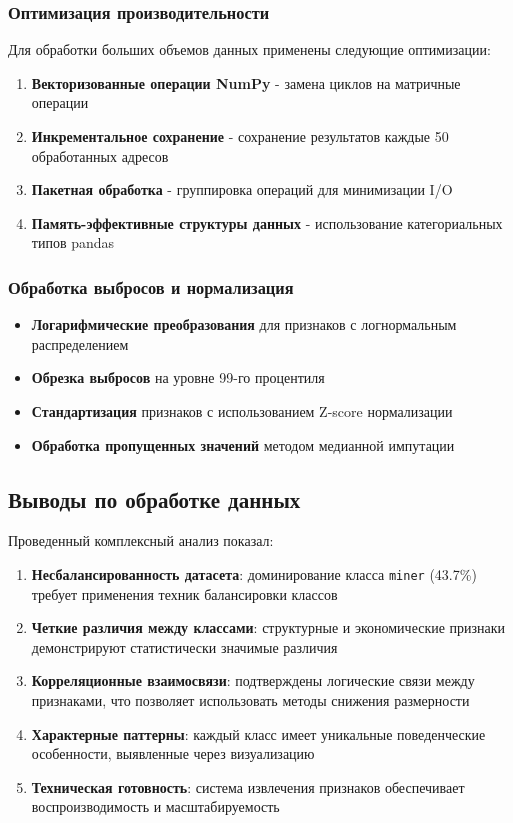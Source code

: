 \subsubsection{Оптимизация производительности}

Для обработки больших объемов данных применены следующие оптимизации:

\begin{enumerate}
    \item \textbf{Векторизованные операции NumPy} - замена циклов на матричные операции
    \item \textbf{Инкрементальное сохранение} - сохранение результатов каждые 50 обработанных адресов
    \item \textbf{Пакетная обработка} - группировка операций для минимизации I/O
    \item \textbf{Память-эффективные структуры данных} - использование категориальных типов pandas
\end{enumerate}

\subsubsection{Обработка выбросов и нормализация}

\begin{itemize}
    \item \textbf{Логарифмические преобразования} для признаков с логнормальным распределением
    \item \textbf{Обрезка выбросов} на уровне 99-го процентиля
    \item \textbf{Стандартизация} признаков с использованием Z-score нормализации
    \item \textbf{Обработка пропущенных значений} методом медианной импутации
\end{itemize}

\subsection{Выводы по обработке данных}

Проведенный комплексный анализ показал:

\begin{enumerate}
    \item \textbf{Несбалансированность датасета}: доминирование класса \texttt{miner} (43.7\%) требует применения техник балансировки классов
    \item \textbf{Четкие различия между классами}: структурные и экономические признаки демонстрируют статистически значимые различия
    \item \textbf{Корреляционные взаимосвязи}: подтверждены логические связи между признаками, что позволяет использовать методы снижения размерности
    \item \textbf{Характерные паттерны}: каждый класс имеет уникальные поведенческие особенности, выявленные через визуализацию
    \item \textbf{Техническая готовность}: система извлечения признаков обеспечивает воспроизводимость и масштабируемость
\end{enumerate}

